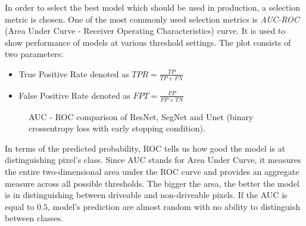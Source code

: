 In order to select the best model which should be used in production,
a selection metric is chosen.
One of the most commonly used selection metrics is 
\textit{AUC-ROC} (Area Under Curve - Receiver Operating Characteristics) curve.
It is used to show performance of models at various threshold settings.
The plot consists of two parameters:
\begin{itemize}
    \item True Positive Rate denoted as $TPR = \frac{TP}{TP + FN}$
    \item False Positive Rate denoted as $FPT = \frac{FP}{FP + TN}$
\end{itemize}

\begin{figure}[h!]
	\begin{center}
		\hspace{0.01em}
	\end{center}
	\caption[AUC - ROC comparison of ResNet, SegNet and Unet]{AUC - ROC comparison of ResNet,
	SegNet and Unet (binary crossentropy loss with early stopping condition).}
	\label{img:roc_base_models}
\end{figure}

In terms of the predicted probability, ROC tells us how good the model is
at distinguishing pixel's class.
Since AUC stands for Area Under Curve, it measures the entire two-dimensional area
under the ROC curve and provides an aggregate measure across all possible thresholds.
The bigger the area, the better the model is in distinguishing between driveable and
non-driveable pixels. If the AUC is equal to $0.5$, model's prediction are almost random with no
ability to distinguish between classes.

